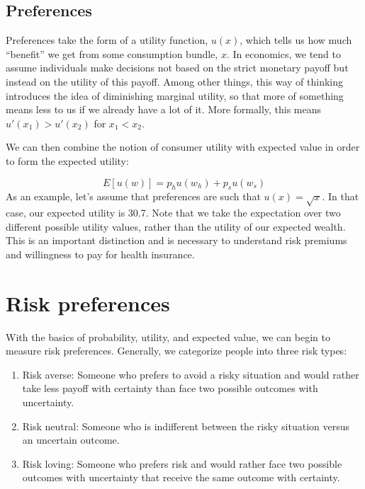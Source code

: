 \documentclass[
  letterpaper,
  DIV=11,
  numbers=noendperiod]{scrreport}
\providecommand{\tightlist}{%
  \setlength{\itemsep}{0pt}\setlength{\parskip}{0pt}}\usepackage{longtable,booktabs,array}
\theoremstyle{definition}
\theoremstyle{remark}
\begin{document}
\hypertarget{preferences}{%
\subsection*{Preferences}\label{preferences}}

Preferences take the form of a utility function, \(u(x)\), which tells
us how much ``benefit'' we get from some consumption bundle, \(x\). In
economics, we tend to assume individuals make decisions not based on the
strict monetary payoff but instead on the utility of this payoff. Among
other things, this way of thinking introduces the idea of diminishing
marginal utility, so that more of something means less to us if we
already have a lot of it. More formally, this means
\(u'(x_{1})>u'(x_{2})\) for \(x_{1}<x_{2}\).

We can then combine the notion of consumer utility with expected value
in order to form the expected utility:

\[E[u(w)]=p_{h}u(w_{h}) + p_{s}u(w_{s})\] As an example, let's assume
that preferences are such that \(u(x)=\sqrt x\). In that case, our
expected utility is 30.7. Note that we take the expectation over two
different possible utility values, rather than the utility of our
expected wealth. This is an important distinction and is necessary to
understand risk premiums and willingness to pay for health insurance.

\hypertarget{risk-preferences}{%
\section{Risk preferences}\label{risk-preferences}}

With the basics of probability, utility, and expected value, we can
begin to measure risk preferences. Generally, we categorize people into
three risk types:

\begin{enumerate}
\def\labelenumi{\arabic{enumi}.}
\tightlist
\item
  Risk averse: Someone who prefers to avoid a risky situation and would
  rather take less payoff with certainty than face two possible outcomes
  with uncertainty.
\item
  Risk neutral: Someone who is indifferent between the risky situation
  versus an uncertain outcome.
\item
  Risk loving: Someone who prefers risk and would rather face two
  possible outcomes with uncertainty that receive the same outcome with
  certainty.
\end{enumerate}
\end{document}
